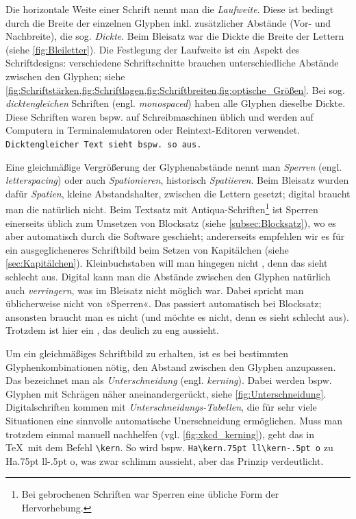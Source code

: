 Die horizontale Weite einer Schrift nennt man die \emph{Laufweite}.
Diese ist bedingt durch die Breite der einzelnen Glyphen
inkl. zusätzlicher Abstände (Vor- und Nachbreite), die
sog. \emph{Dickte}.  Beim Bleisatz war die Dickte die Breite der
Lettern (siehe \cref{fig:Bleiletter}).  Die Festlegung der Laufweite
ist ein Aspekt des Schriftdesigns: verschiedene Schriftschnitte
brauchen unterschiedliche Abstände zwischen den Glyphen; siehe
\cref{fig:Schriftstärken,fig:Schriftlagen,fig:Schriftbreiten,fig:optische_Größen}.
Bei sog. \emph{dicktengleichen} Schriften
(engl. \emph{\foreignlanguage{british}{monospaced}}) haben alle
Glyphen dieselbe Dickte.  Diese Schriften waren bspw. auf
Schreibmaschinen üblich und werden auf Computern in Terminalemulatoren
oder Reintext-Editoren verwendet.  \texttt{Dicktengleicher Text sieht
  bspw. so aus.}

Eine gleichmäßige Vergrößerung der Glyphenabstände nennt man
\emph{Sperren} (engl. \emph{\foreignlanguage{british}{letterspacing}})
oder auch \emph{Spationieren}, historisch \emph{Spatiieren}.  Beim
Bleisatz wurden dafür \emph{Spatien}, kleine Abstandshalter, zwischen
die Lettern gesetzt; digital braucht man die natürlich nicht.  Beim
Textsatz mit Antiqua-Schriften\footnote{Bei gebrochenen Schriften war
  Sperren eine übliche Form der Hervorhebung.} ist Sperren einerseits
üblich zum Umsetzen von Blocksatz (siehe \cref{subsec:Blocksatz}), wo
es aber automatisch durch die Software geschieht; andererseits
empfehlen wir es für ein ausgeglicheneres Schriftbild beim Setzen von
Kapitälchen (siehe \cref{sec:Kapitälchen}).  Kleinbuchstaben will man
hingegen nicht , denn das sieht schlecht aus.
Digital kann man die Abstände zwischen den Glyphen natürlich auch
\emph{verringern}, was im Bleisatz nicht möglich war.  Dabei spricht
man üblicherweise nicht von »Sperren«.  Das passiert automatisch bei
Blocksatz; ansonsten braucht man es nicht (und möchte es nicht, denn
es sieht schlecht aus).  Trotzdem ist hier ein ,
das deulich zu eng aussieht.

Um ein gleichmäßiges Schriftbild zu erhalten, ist es bei bestimmten
Glyphenkombinationen nötig, den Abstand zwischen den Glyphen
anzupassen.  Das bezeichnet man als \emph{Unterschneidung}
(engl. \emph{\foreignlanguage{british}{kerning}}).  Dabei werden
bspw. Glyphen mit Schrägen näher aneinandergerückt, siehe
\cref{fig:Unterschneidung}.  Digitalschriften kommen mit
\emph{Un\-ter\-schnei\-dungs-Tabellen}, die für sehr viele Situationen
eine sinnvolle automatische Unerschneidung ermöglichen.  Muss man
trotzdem einmal manuell nachhelfen (vgl. \cref{fig:xkcd_kerning}),
geht das in \TeX\ mit dem Befehl \verb!\kern!.  So wird
bspw. \verb!Ha\kern.75pt ll\kern-.5pt o! zu Ha\kern.75pt ll\kern-.5pt
o, was zwar schlimm aussieht, aber das Prinzip verdeutlicht.

